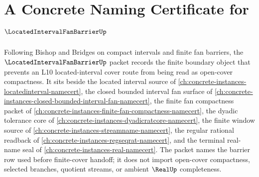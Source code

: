 \chapter{A Concrete Naming Certificate for $\LocatedIntervalFanBarrierUp$}
\label{ch:concrete-instances-located-interval-fan-barrier-namecert}

Following Bishop and Bridges on compact intervals and finite fan barriers, the $\LocatedIntervalFanBarrierUp$ packet records the finite boundary object that prevents an L10 located-interval cover route from being read as open-cover compactness. It sits beside the located interval source of \autoref{ch:concrete-instances-locatedinterval-namecert}, the closed bounded interval fan surface of \autoref{ch:concrete-instances-closed-bounded-interval-fan-namecert}, the finite fan compactness packet of \autoref{ch:concrete-instances-finite-fan-compactness-namecert}, the dyadic tolerance core of \autoref{ch:concrete-instances-dyadicratcore-namecert}, the finite window source of \autoref{ch:concrete-instances-streamname-namecert}, the regular rational readback of \autoref{ch:concrete-instances-regseqrat-namecert}, and the terminal real-name seal of \autoref{ch:concrete-instances-real-namecert}. The packet names the barrier row used before finite-cover handoff; it does not import open-cover compactness, selected branches, quotient streams, or ambient $\RealUp$ completeness.

